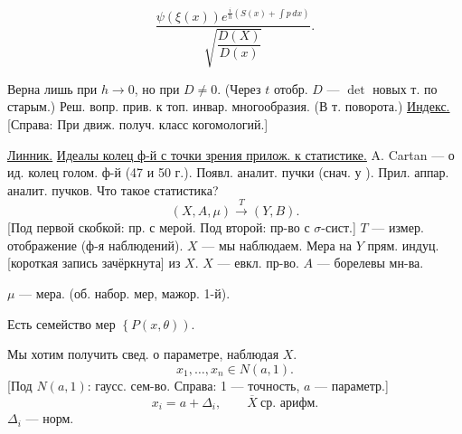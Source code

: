 \par\noindent\begin{minipage}{\linewidth}
\begin{equation*}
\frac{\psi(\xi(x))e^{\frac{i}{h}(S(x)+\int p\,dx)}}{\sqrt{\dfrac{D(X)}{D(x)}}}.
\end{equation*}
\end{minipage}\par
[Справа: норм. множитель.]
Верна лишь при $h\longrightarrow0$, но при $D\ne0$.
(Через $t$ отобр. $D$ --- $\det$ новых т. по старым.)
Реш. вопр. прив. к топ. инвар. многообразия.
(В т. поворота.) \underline{Индекс.}
[Справа: При движ. получ. класс когомологий.]

\underline{Линник.}
\underline{Идеалы колец ф-й с точки зрения прилож. к статистике.}
A. Cartan --- о ид. колец голом. ф-й (47 и 50 г.).
Появл. аналит. пучки (снач. у ).
Прил. аппар. аналит. пучков.
Что такое статистика?
\begin{equation*}
(X,A,\mu)\overset{T}{\longrightarrow}(Y,B).
\end{equation*}
[Под первой скобкой: пр. с мерой. Под второй: пр-во с $\sigma$-сист.]
$T$ --- измер. отображение (ф-я наблюдений).
$X$ --- мы наблюдаем.
Мера на $Y$ прям. индуц. [короткая запись зачёркнута] из $X$.
$X$ --- евкл. пр-во.
$A$ --- борелевы мн-ва.
\par\noindent\begin{minipage}{\linewidth}
$\mu$ --- мера.
(\textcolor{orange!65!black}{об. набор. мер, мажор. 1-й}).
\end{minipage}\par
\par\noindent\begin{minipage}{\linewidth}
Есть семейство мер $\left\{P(x,\theta)\right)$.
\end{minipage}\par
[Под $P(x,\theta)$: зад. плотностью.]
Мы хотим получить свед. о параметре, наблюдая $X$.
\begin{equation*}
x_1,\ldots,x_n\in N(a,1).
\end{equation*}
[Под $N(a,1)$: гаусс. сем-во. Справа: 1 --- точность, $a$ --- параметр.]
\begin{equation*}
x_i=a+\Delta_i,\qquad\overline X\ \text{ср. арифм.}
\end{equation*}
$\Delta_i$ --- норм.

